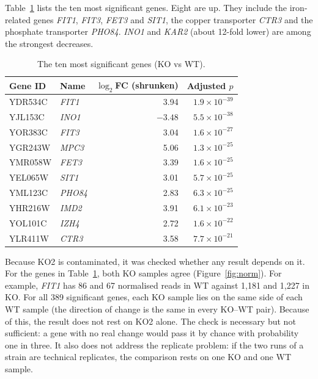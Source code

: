 \documentclass[11pt, a4paper]{article}
\newcommand{\gene}[1]{\textit{#1}}
\begin{document}
Table~\ref{tab:top} lists the ten most significant genes. Eight are up. They include the iron-related genes \gene{FIT1}, \gene{FIT3}, \gene{FET3} and \gene{SIT1}, the copper transporter \gene{CTR3} and the phosphate transporter \gene{PHO84}. \gene{INO1} and \gene{KAR2} (about 12-fold lower) are among the strongest decreases.

\begin{table}[tbp]
\centering
\caption{The ten most significant genes (KO vs WT).}
\label{tab:top}
\begin{tabular}{llrr}
\toprule
Gene ID & Name & $\log_2$FC (shrunken) & Adjusted $p$ \\
\midrule
YDR534C & \gene{FIT1} & 3.94 & $1.9\times10^{-39}$ \\
YJL153C & \gene{INO1} & $-3.48$ & $5.5\times10^{-38}$ \\
YOR383C & \gene{FIT3} & 3.04 & $1.6\times10^{-27}$ \\
YGR243W & \gene{MPC3} & 5.06 & $1.3\times10^{-25}$ \\
YMR058W & \gene{FET3} & 3.39 & $1.6\times10^{-25}$ \\
YEL065W & \gene{SIT1} & 3.01 & $5.7\times10^{-25}$ \\
YML123C & \gene{PHO84} & 2.83 & $6.3\times10^{-25}$ \\
YHR216W & \gene{IMD2} & 3.91 & $6.1\times10^{-23}$ \\
YOL101C & \gene{IZH4} & 2.72 & $1.6\times10^{-22}$ \\
YLR411W & \gene{CTR3} & 3.58 & $7.7\times10^{-21}$ \\
\bottomrule
\end{tabular}
\end{table}

Because KO2 is contaminated, it was checked whether any result depends on it. For the genes in Table~\ref{tab:top}, both KO samples agree (Figure~\ref{fig:norm}). For example, \gene{FIT1} has 86 and 67 normalised reads in WT against 1,181 and 1,227 in KO. For all 389 significant genes, each KO sample lies on the same side of each WT sample (the direction of change is the same in every KO--WT pair). Because of this, the result does not rest on KO2 alone. The check is necessary but not sufficient: a gene with no real change would pass it by chance with probability one in three. It also does not address the replicate problem: if the two runs of a strain are technical replicates, the comparison rests on one KO and one WT sample.
\end{document}
